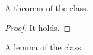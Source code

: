 \documentclass{llncs}
\begin{document}
\begin{theorem}
A theorem of the class.
\end{theorem}
\begin{proof}
It holds.
\end{proof}
\begin{lemma}
A lemma of the class.
\end{lemma}
\end{document}
